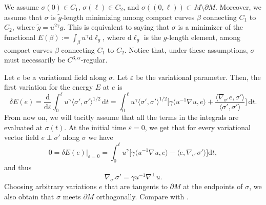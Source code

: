 \documentclass[12pt,a4paper,reqno]{amsart}
\theoremstyle{definition}
\newcommand{\D}{\nabla}
\newcommand{\metric}[2]{\langle#1,#2\rangle}
\renewcommand{\tilde}{\widetilde}
\renewcommand{\epsilon}{\varepsilon}
\begin{document}
     We assume $\sigma(0)\in C_1$, $\sigma(\ell)\in C_2$, and $\sigma((0,\ell))\subset M\setminus\partial M$. Moreover, we assume that $\sigma$ is $\tilde g$-length minimizing among compact curves $\beta$ connecting $C_1$ to $C_2$, where $\tilde g=u^{2\gamma}g$. This is equivalent to saying that $\sigma$ is a minimizer of the functional $E(\beta):=\int_\beta u^\gamma \mathrm{d}\ell_g$, where $\mathrm{d}\ell_g$ is the $g$-length element, among compact curves $\beta$ connecting $C_1$ to $C_2$.  Notice that, under these assumptions, $\sigma$ must necessarily be $C^{3,\alpha}$-regular.
     \smallskip
    
    Let $e$ be a variational field along $\sigma$. Let $\epsilon$ be the variational parameter. Then, the first variation for the energy $E$ at $e$ is
\[\delta E(e)=\frac {\mathrm{d}}{\mathrm{d}\epsilon}\int_0^\ell u^\gamma\metric{\sigma'}{\sigma'}^{1/2}\,\mathrm{d}t=\int_0^\ell u^\gamma\metric{\sigma'}{\sigma'}^{1/2}\Big[\gamma\metric{u^{-1}\D u}{e}+\frac{\metric{\nabla_{\sigma'}e}{\sigma'}}{\metric{\sigma'}{\sigma'}}\Big]\,\mathrm{d}t.\]
From now on, we will tacitly assume that all the terms in the integrals are evaluated at $\sigma(t)$. At the initial time $\epsilon=0$, we get that for every variational vector field $e\perp\sigma'$ along $\sigma$ we have
\[
    0=\delta E(e)|_{\epsilon=0}=\int_0^\ell u^{\gamma}\Big[\gamma\metric{u^{-1}\D u}{e}-\metric{e}{\D_{\sigma'}\sigma'}\Big]\mathrm{d}t,
\]
and thus 
\begin{equation}\label{critical}
    \D_{\sigma'}\sigma'=\gamma u^{-1}\D^\perp u.
\end{equation}
Choosing arbitrary variations $e$ that are tangents to $\partial M$ at the endpoints of $\sigma$, we also obtain that $\sigma$ meets $\partial M$ orthogonally. Compare with \cite[Lemma 2.3]{HongWang}.
\end{document}
